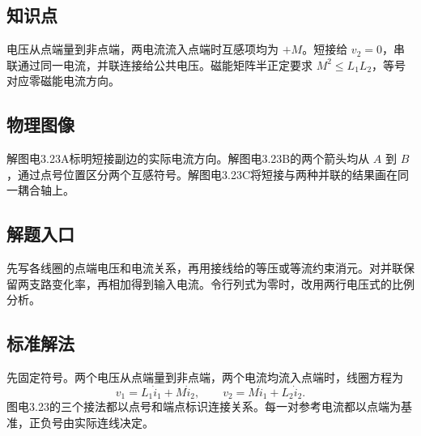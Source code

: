 \documentclass[UTF8,fontset=fandol,a4paper,11pt]{ctexart}
\begin{document}


\subsection*{知识点}

电压从点端量到非点端，两电流流入点端时互感项均为 $+M$。短接给 $v_2=0$，串联通过同一电流，并联连接给公共电压。磁能矩阵半正定要求 $M^2\le L_1L_2$，等号对应零磁能电流方向。



\subsection*{物理图像}

解图电3.23A标明短接副边的实际电流方向。解图电3.23B的两个箭头均从 $A$ 到 $B$，通过点号位置区分两个互感符号。解图电3.23C将短接与两种并联的结果画在同一耦合轴上。



\subsection*{解题入口}

先写各线圈的点端电压和电流关系，再用接线给的等压或等流约束消元。对并联保留两支路变化率，再相加得到输入电流。令行列式为零时，改用两行电压式的比例分析。


\subsection*{标准解法}

先固定符号。两个电压从点端量到非点端，两个电流均流入点端时，线圈方程为
\[
v_1=L_1\dot i_1+M\dot i_2,\qquad
v_2=M\dot i_1+L_2\dot i_2.
\]
图电3.23的三个接法都以点号和端点标识连接关系。每一对参考电流都以点端为基准，正负号由实际连线决定。
\end{document}
